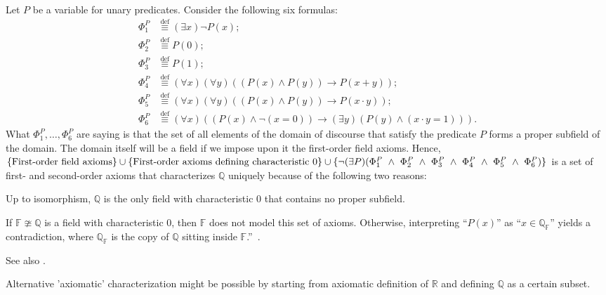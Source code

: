 Let $ P $ be a variable for unary predicates. 
Consider the following six formulas: 
\begin{align} 
\Phi^{P}_{1} &\stackrel{\text{def}}{\equiv} 
(\exists x) \neg P(x); 
\\ \Phi^{P}_{2} &\stackrel{\text{def}}{\equiv} P(0); 
\\ \Phi^{P}_{3} &\stackrel{\text{def}}{\equiv} P(1); 
\\ \Phi^{P}_{4} &\stackrel{\text{def}}{\equiv} 
(\forall x)(\forall y)((P(x) \land P(y)) 
\rightarrow P(x + y)); \\ \Phi^{P}_{5} 
&\stackrel{\text{def}}{\equiv} 
(\forall x)(\forall y)
((P(x) 
\land P(y)) \rightarrow P(x \cdot y));
\\ \Phi^{P}_{6} 
&\stackrel{\text{def}}{\equiv} 
(\forall x)((P(x) \land \neg (x = 0)) \rightarrow
(\exists y)(P(y) \land (x \cdot y = 1))). 
\end{align} 
What $ \Phi^{P}_{1},\ldots,\Phi^{P}_{6} $ are saying is that 
the set of all elements of the domain of discourse 
that satisfy the predicate $ P $ 
forms a proper subfield of the domain. 
The domain itself will be a field 
if we impose upon it the first-order field axioms. 
Hence, 
$ \{ \text{First-order field axioms} \} 
\cup 
\{ \text{First-order axioms defining characteristic $ 0 $} \}
 \cup
\{ \neg (\exists P)(\Phi^{P}_{1} 
~ \land ~ \Phi^{P}_{2} ~ \land ~ 
\Phi^{P}_{3} ~ \land ~ 
\Phi^{P}_{4} ~ \land ~ 
\Phi^{P}_{5} ~ \land ~ \Phi^{P}_{6}) \} $
is a set of first- and second-order axioms that characterizes
$ \mathbb{Q} $ uniquely because of the following two reasons:

Up to isomorphism, 
$ \mathbb{Q} $ is the only field with characteristic $ 0 $ 
that contains no proper subfield.

If $ \mathbb{F} \ncong \mathbb{Q} $ is 
a field with characteristic $ 0 $, 
then $ \mathbb{F} $ does not model this set of axioms. 
Otherwise, interpreting “$ P(x) $” as 
“$ x \in \mathbb{Q}_{\mathbb{F}} $” yields a contradiction, 
where $ \mathbb{Q}_{\mathbb{F}} $ is the copy of $ \mathbb{Q} $ 
sitting inside 
$ \mathbb{F} $.''~\cite{HaskellCurry:2012:RationalAxioms}.


See also \cite{Lawrence:2017:Rationals}.

\label{sec:Q_subset_of_R}

Alternative 'axiomatic' characterization
might be possible by starting from axiomatic definition of
$\mathbb{R}$ and defining $\mathbb{Q}$ as a certain subset.
\label{sec:Equivalence_classes_of_integer_pairs}

